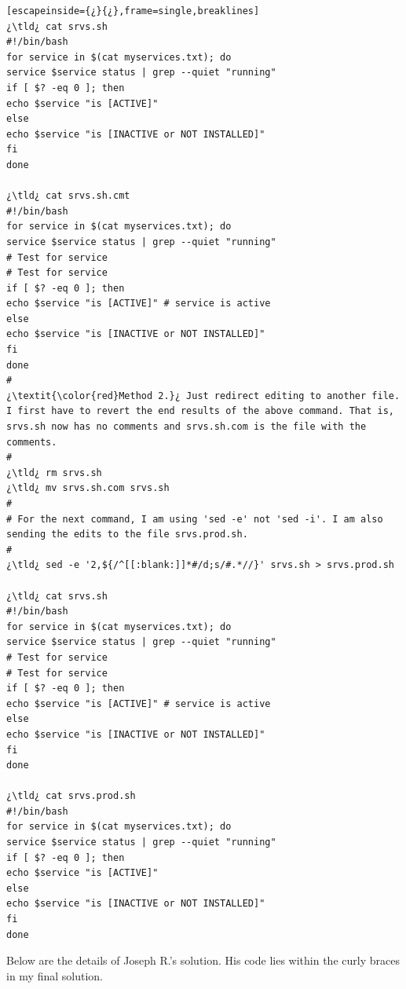 \begin{lstlisting}[escapeinside={¿}{¿},frame=single,breaklines]
¿\tld¿ cat srvs.sh
#!/bin/bash
for service in $(cat myservices.txt); do   
service $service status | grep --quiet "running"
if [ $? -eq 0 ]; then
echo $service "is [ACTIVE]" 
else
echo $service "is [INACTIVE or NOT INSTALLED]"
fi
done

¿\tld¿ cat srvs.sh.cmt
#!/bin/bash
for service in $(cat myservices.txt); do   
service $service status | grep --quiet "running"
# Test for service
# Test for service
if [ $? -eq 0 ]; then
echo $service "is [ACTIVE]" # service is active
else
echo $service "is [INACTIVE or NOT INSTALLED]"
fi
done
#
¿\textit{\color{red}Method 2.}¿ Just redirect editing to another file. I first have to revert the end results of the above command. That is, srvs.sh now has no comments and srvs.sh.com is the file with the comments.
#
¿\tld¿ rm srvs.sh
¿\tld¿ mv srvs.sh.com srvs.sh
#
# For the next command, I am using 'sed -e' not 'sed -i'. I am also sending the edits to the file srvs.prod.sh.
#
¿\tld¿ sed -e '2,${/^[[:blank:]]*#/d;s/#.*//}' srvs.sh > srvs.prod.sh

¿\tld¿ cat srvs.sh
#!/bin/bash
for service in $(cat myservices.txt); do   
service $service status | grep --quiet "running"
# Test for service
# Test for service
if [ $? -eq 0 ]; then
echo $service "is [ACTIVE]" # service is active
else
echo $service "is [INACTIVE or NOT INSTALLED]"
fi
done

¿\tld¿ cat srvs.prod.sh
#!/bin/bash
for service in $(cat myservices.txt); do   
service $service status | grep --quiet "running"
if [ $? -eq 0 ]; then
echo $service "is [ACTIVE]" 
else
echo $service "is [INACTIVE or NOT INSTALLED]"
fi
done
\end{lstlisting}

Below are the details of Joseph R.'s solution. His code lies within the curly braces in my final solution.

